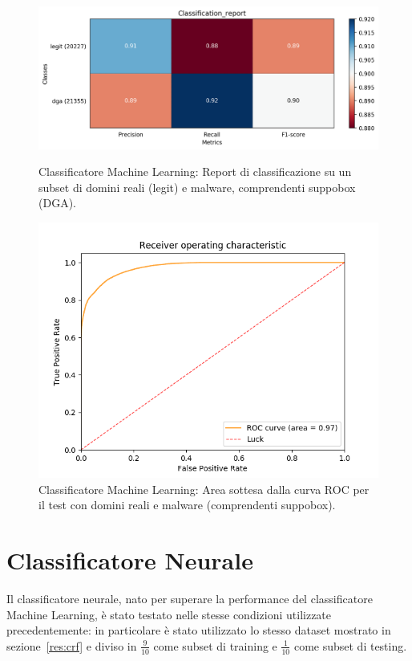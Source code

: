 \begin{figure}[!bp]
    \centering
    \includegraphics[width=\columnwidth]{figures/rndf_tra_sup_sup/class_rep.png}
    \caption{Classificatore Machine Learning: Report di classificazione su un subset di domini reali (legit) e malware, comprendenti suppobox (DGA).\label{fig:repall}}

    \centering
    \includegraphics[width=\columnwidth]{figures/rndf_tra_sup_sup/roc_plot.png}
    \caption{Classificatore Machine Learning: Area sottesa dalla curva ROC per il test con domini reali e malware (comprendenti suppobox).\label{fig:rocall}}
\end{figure}

\newpage
\section{Classificatore Neurale}
\label{ris:cnn}
Il classificatore neurale, nato per superare la performance del classificatore Machine Learning, è stato testato nelle stesse condizioni utilizzate precedentemente: in particolare è stato utilizzato lo stesso dataset mostrato in sezione~\ref{res:crf} e diviso in $\frac{9}{10}$ come subset di training e $\frac{1}{10}$ come subset di testing.

